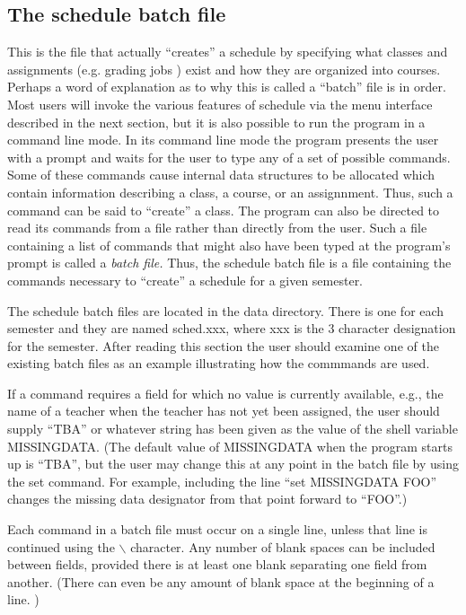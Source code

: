 \subsection{The schedule batch file}

This is the file that actually ``creates'' a schedule by specifying what
classes and assignments (e.g. grading jobs ) exist and how they are 
organized into courses. Perhaps a word of explanation as to why this is
called a ``batch'' file is in order. Most users will invoke the various
features of schedule via the menu interface described in the next section, but
it is also possible to run the program in a command line mode. In its command
line mode the program presents the user with a prompt and waits for the
user to type any of a set of possible commands. Some of these commands
cause internal data structures to be allocated which contain information
describing a class, a course, or an assignnment. Thus, such a command can
be said to ``create'' a class. The program can also be directed to read
its commands from a file rather than directly from the user. Such a file
containing a list of commands that might also have been typed at the program's
prompt is called a {\it batch file.} Thus, the schedule batch file is
a file containing the commands necessary to ``create'' a schedule for a
given semester.   

The schedule batch files are located in the data directory. There is one
for each semester and they are named sched.xxx, where xxx is the 3 character
designation for the semester.  After 
reading this section the user should examine one of the existing
batch files as an example illustrating how the commmands are used. 

If a command requires a field for which no value is currently available, 
e.g., the name of a teacher when the teacher has not yet been assigned, the
user should supply ``TBA'' or whatever string has been given as the
value of the shell variable MISSINGDATA. (The default value of MISSINGDATA
when the program starts up is ``TBA'', but the user may change this
at any point in the batch file by using the set command. For example, 
including the line ``set MISSINGDATA FOO'' changes the missing data 
designator from that point forward to ``FOO''.)

Each command in a batch file must occur on a single line, unless that line
is continued using the $\backslash$ character. Any number of blank spaces 
can be included between fields, provided there is at least one blank separating
one field from another. (There can even be any amount of blank space at
the beginning of a line. )

